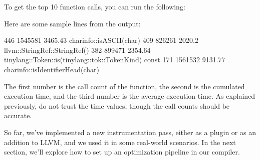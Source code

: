 To get the top 10 function calls, you can run the following:


Here are some sample lines from the output:

\begin{shell}
446 1545581 3465.43 charinfo::isASCII(char)
409 826261 2020.2 llvm::StringRef::StringRef()
382 899471 2354.64
            tinylang::Token::is(tinylang::tok::TokenKind) const
171 1561532 9131.77 charinfo::isIdentifierHead(char)
\end{shell}

The first number is the call count of the function, the second is the cumulated execution time, and the third number is the average execution time. As explained previously, do not trust the time values, though the call counts should be accurate.

So far, we’ve implemented a new instrumentation pass, either as a plugin or as an addition to LLVM, and we used it in some real-world scenarios. In the next section, we’ll explore how to set up an optimization pipeline in our compiler.


